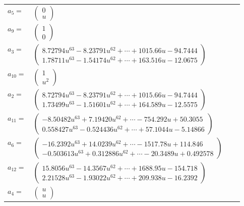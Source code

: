 \documentclass[1p]{elsarticle_modified}
\theoremstyle{definition}
\begin{document}
\begin{tabular}{m{7pt} m{180pt} m{7pt} m{180pt} }
\flushright $a_{5}=$&$\begin{pmatrix}0\\u\end{pmatrix}$ \\
\flushright $a_{9}=$&$\begin{pmatrix}1\\0\end{pmatrix}$ \\
\flushright $a_{3}=$&$\begin{pmatrix}8.72794 u^{63}-8.23791 u^{62}+\cdots+1015.66 u-94.7444\\1.78711 u^{63}-1.54174 u^{62}+\cdots+163.516 u-12.0675\end{pmatrix}$ \\
\flushright $a_{10}=$&$\begin{pmatrix}1\\u^2\end{pmatrix}$ \\
\flushright $a_{2}=$&$\begin{pmatrix}8.72794 u^{63}-8.23791 u^{62}+\cdots+1015.66 u-94.7444\\1.73499 u^{63}-1.51601 u^{62}+\cdots+164.589 u-12.5575\end{pmatrix}$ \\
\flushright $a_{11}=$&$\begin{pmatrix}-8.50482 u^{63}+7.19420 u^{62}+\cdots-754.292 u+50.3055\\0.558427 u^{63}-0.524436 u^{62}+\cdots+57.1044 u-5.14866\end{pmatrix}$ \\
\flushright $a_{6}=$&$\begin{pmatrix}-16.2392 u^{63}+14.0239 u^{62}+\cdots-1517.78 u+114.846\\-0.503613 u^{63}+0.312886 u^{62}+\cdots-20.3489 u+0.492578\end{pmatrix}$ \\
\flushright $a_{12}=$&$\begin{pmatrix}15.8056 u^{63}-14.3567 u^{62}+\cdots+1688.95 u-154.718\\2.21528 u^{63}-1.93022 u^{62}+\cdots+209.938 u-16.2392\end{pmatrix}$ \\
\flushright $a_{4}=$&$\begin{pmatrix}u\\u\end{pmatrix}$ \\

\end{tabular}
\end{document}
